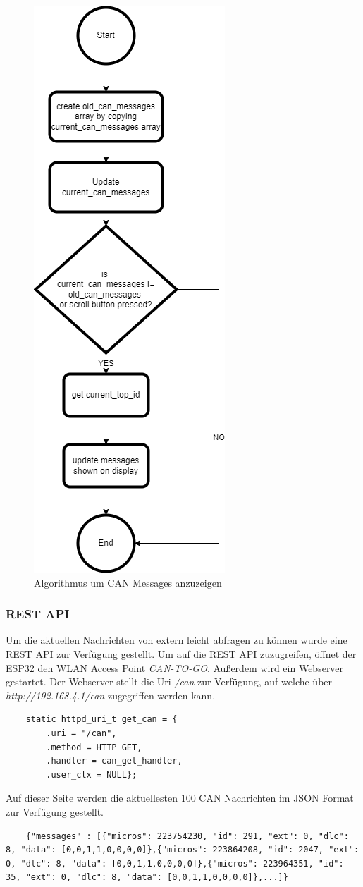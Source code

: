 \begin{figure}
  \centering
  \includegraphics[height=0.8\textwidth]{img/display_controller_show_messages.png}
  \caption{Algorithmus um CAN Messages anzuzeigen}
  \label{fig:display_controller_show_messages}
\end{figure}
\subsubsection{REST API}
Um die aktuellen Nachrichten von extern leicht abfragen zu können wurde eine REST API zur Verfügung gestellt. Um auf die REST API zuzugreifen, öffnet der ESP32 den WLAN Access Point \textit{CAN-TO-GO}. Außerdem wird ein Webserver gestartet. Der Webserver stellt die Uri \textit{/can} zur Verfügung, auf welche über \textit{http://192.168.4.1/can} zugegriffen werden kann.
\begin{lstlisting}
    static httpd_uri_t get_can = {
        .uri = "/can",
        .method = HTTP_GET,
        .handler = can_get_handler,
        .user_ctx = NULL};
\end{lstlisting}
Auf dieser Seite werden die aktuellesten 100 CAN Nachrichten im JSON Format zur Verfügung gestellt.
\begin{lstlisting}
    {"messages" : [{"micros": 223754230, "id": 291, "ext": 0, "dlc": 8, "data": [0,0,1,1,0,0,0,0]},{"micros": 223864208, "id": 2047, "ext": 0, "dlc": 8, "data": [0,0,1,1,0,0,0,0]},{"micros": 223964351, "id": 35, "ext": 0, "dlc": 8, "data": [0,0,1,1,0,0,0,0]},...]}
\end{lstlisting}

